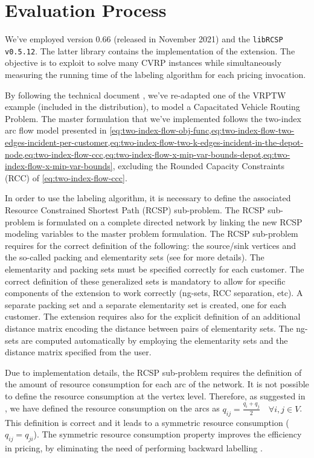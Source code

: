 \section{Evaluation Process}
\label{sec:results-evaluation-process}

We've employed \bapcod{} version 0.66 (released in November 2021) and the \texttt{libRCSP v0.5.12}.
The latter library contains the implementation of the \vrpsolver{} extension.
The objective is to exploit \bapcod{} to solve many CVRP instances while simultaneously
measuring the running time of the labeling algorithm for each pricing invocation.

\medskip

By following the \bapcod{} technical document \parencite{sadykov2021},
we've re-adapted one of the VRPTW example (included in the distribution),
to model a Capacitated Vehicle Routing Problem.
The master formulation that we've implemented follows the two-index arc flow model
presented in \cref{eq:two-index-flow-obj-func,eq:two-index-flow-two-edges-incident-per-customer,eq:two-index-flow-two-k-edges-incident-in-the-depot-node,eq:two-index-flow-ccc,eq:two-index-flow-x-mip-var-bounds-depot,eq:two-index-flow-x-mip-var-bounds},
excluding the Rounded Capacity Constraints (RCC) of \cref{eq:two-index-flow-ccc}.

In order to use the \vrpsolver{} labeling algorithm, it is necessary
to define the associated Resource Constrained Shortest Path (RCSP) sub-problem.
The RCSP sub-problem is formulated on a complete directed network by
linking the new RCSP modeling variables to the master problem formulation.
The RCSP sub-problem requires for the correct definition of the following:
the source/sink vertices and the so-called packing and elementarity sets
(see \cite{pessoa2020generic} for more details).
The elementarity and packing sets must be specified correctly for each customer.
The correct definition of these generalized sets is mandatory to allow for specific
components of the \vrpsolver{} extension to work correctly (ng-sets, RCC separation, etc).
A separate packing set and a separate elementarity set is created, one for each customer.
The \vrpsolver{} extension requires also for the explicit definition of an additional
distance matrix encoding the distance between pairs of elementarity sets.
The ng-sets are computed automatically by employing the elementarity sets
and the distance matrix specified from the user.

Due to implementation details, the RCSP sub-problem requires
the definition of the amount of resource consumption for each arc of the network.
It is not possible to define the resource consumption at the vertex level.
Therefore, as suggested in \textcite{pessoa2020generic}, we have defined the resource consumption
on the arcs as $q_{ij} = \frac{q_{i} + q_{j}}{2} \quad \forall i, j \in V$.
This definition is correct and it leads to a symmetric resource consumption ($q_{ij} = q_{ji}$).
The symmetric resource consumption property improves the efficiency in pricing,
by eliminating the need of performing backward labelling \parencite{pessoa2020generic}.

